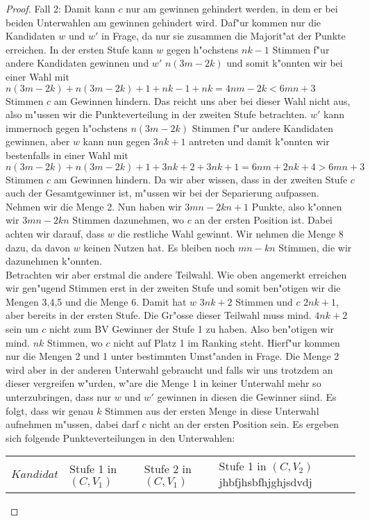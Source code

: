 \documentclass[11pt, a4paper, twoside]{article}
\newcommand{\wf}{\color{white}}
\newcommand{\tf}{\color{black}}
\begin{document}
\begin{proof}
Fall 2: Damit kann $c$ nur am gewinnen gehindert werden, in dem er bei beiden Unterwahlen am gewinnen gehindert wird. Daf"ur kommen nur die Kandidaten $w$ und $w'$ in Frage, da nur sie zusammen die Majorit"at der Punkte erreichen. In der ersten Stufe kann $w$ gegen h"ochstens $nk-1$ Stimmen f"ur andere Kandidaten gewinnen und $w'$ $n(3m-2k)$ und somit k"onnten wir bei einer Wahl mit $n(3m-2k)+n(3m-2k)+1+nk-1+nk=4nm-2k<6mn+3$ Stimmen $c$ am Gewinnen hindern. Das reicht uns aber bei dieser Wahl nicht aus, also m"ussen wir die Punkteverteilung in der zweiten Stufe betrachten. $w'$ kann immernoch gegen h"ochstens $n(3m-2k)$ Stimmen f"ur andere Kandidaten gewinnen, aber $w$ kann nun gegen $3nk+1$ antreten und damit k"onnten wir bestenfalls in einer Wahl mit $n(3m-2k)+n(3m-2k)+1+3nk+2+3nk+1=6nm+2nk+4 > 6mn+3$ Stimmen $c$ am Gewinnen hindern. Da wir aber wissen, dass in der zweiten Stufe $c$ auch der Gesamtgewinner ist, m"ussen wir bei der Separierung aufpassen. Nehmen wir die Menge 2. Nun haben wir $3mn-2kn+1$ Punkte, also k"onnen wir $3mn-2kn$ Stimmen dazunehmen, wo $c$ an der ersten Position ist. Dabei achten wir darauf, dass $w$ die restliche Wahl gewinnt. Wir nehmen die Menge 8 dazu, da davon $w$ keinen Nutzen hat. Es bleiben noch $mn-kn$ Stimmen, die wir dazunehmen k"onnten.\\ Betrachten wir aber erstmal die andere Teilwahl. Wie oben angemerkt erreichen wir gen"ugend Stimmen erst in der zweiten Stufe und somit ben"otigen wir die Mengen 3,4,5 und die Menge 6. Damit hat $w$ $3nk+2$ Stimmen und $c$ $2nk+1$, aber bereits in der ersten Stufe. Die Gr"osse dieser Teilwahl muss mind. $4nk+2$ sein um $c$ nicht zum BV Gewinner der Stufe 1 zu haben. Also ben"otigen wir mind. $nk$ Stimmen, wo $c$ nicht auf Platz 1 im Ranking steht. Hierf"ur kommen nur die Mengen 2 und 1 unter bestimmten Umst"anden in Frage. Die Menge 2 wird aber in der anderen Unterwahl gebraucht und falls wir uns trotzdem an dieser vergreifen w"urden, w"are die Menge 1 in keiner Unterwahl mehr so unterzubringen, dass nur $w$ und $w'$ gewinnen in diesen die Gewinner siind. Es folgt, dass wir genau $k$ Stimmen aus der ersten Menge in diese Unterwahl aufnehmen m"ussen, dabei darf $c$ nicht an der ersten Position sein. Es ergeben sich folgende Punkteverteilungen in den Unterwahlen:\\
\begin{minipage}{\textwidth}{}
\begin{tabular}{|llll|}
\hline
$Kandidat$&Stufe 1 in $(C,V_1)$&Stufe 2 in $(C,V_1)$&Stufe 1 in $(C,V_2)$\wf jhbfjhsbfhjghjsdvdj \tf\\

\end{tabular}
\end{minipage}
\end{proof}
\end{document}
